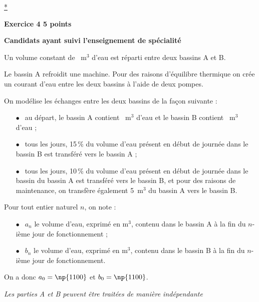 \documentclass[10pt]{article}
\begin{document}
\hyperlink{Index}{*}

\vspace{0,5cm}

\textbf{Exercice 4 \hfill  5 points}

\textbf{Candidats ayant  suivi l'enseignement de spécialité}

\medskip 

Un volume constant de ~m$^3$ d'eau est réparti entre deux bassins A et B.
 
Le bassin A refroidit une machine. Pour des raisons d'équilibre thermique on crée un courant d'eau entre les deux bassins à l'aide de deux pompes.
 
On modélise les échanges entre les deux bassins de la façon suivante :

\setlength\parindent{8mm}
\begin{itemize}
\item[$\bullet~~$] au départ, le bassin A contient ~m$^3$ d'eau et le bassin B contient ~m$^3$ d'eau ; 
\item[$\bullet~~$] tous les jours, 15\,\% du volume d'eau présent en début de journée dans le bassin B est transféré vers le bassin A ; 
\item[$\bullet~~$] tous les jours, 10\,\% du volume d'eau présent en début de journée dans le bassin du bassin A est transféré vers le bassin B, et pour des raisons de maintenance, on transfère également 5~m$^3$ du bassin A vers le bassin B.
\end{itemize}
\setlength\parindent{0mm}

\medskip
 
Pour tout entier naturel $n$, on note :

\medskip
 
\setlength\parindent{8mm}
\begin{itemize}
\item[$\bullet~~$] $a_{n}$ le volume d'eau, exprimé en m$^3$, contenu dans le bassin A à la fin du $n$-ième jour de fonctionnement ; 
\item[$\bullet~~$] $b_{n}$ le volume d'eau, exprimé en m$^3$, contenu dans le bassin B à la fin du $n$-ième jour de fonctionnement.
\end{itemize}
\setlength\parindent{0mm}
 
On a donc $a_{0} =  \np{1100}$  et $b_{0} = \np{1100}$.
 
\emph{Les parties A et B peuvent être traitées de manière indépendante}

\medskip
 
\end{document}
